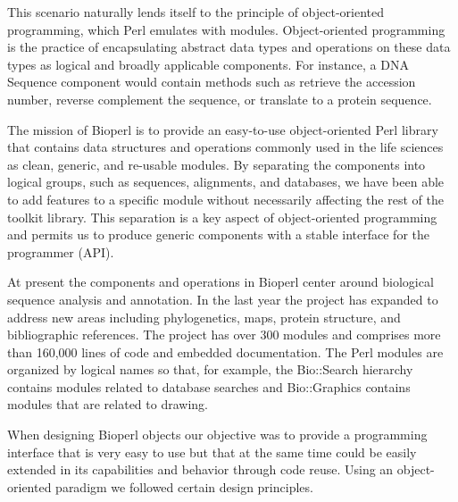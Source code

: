 \documentclass[12pt]{article}
\begin{document}
This scenario naturally lends itself to the principle of
object-oriented programming, which Perl emulates with modules.
Object-oriented programming is the practice of encapsulating abstract
data types and operations on these data types as logical and broadly
applicable components. For instance, a DNA Sequence component would
contain methods such as retrieve the accession number, reverse
complement the sequence, or translate to a protein sequence.

The mission of Bioperl is to provide an easy-to-use object-oriented
Perl library that contains data structures and operations commonly
used in the life sciences as clean, generic, and re-usable modules.
By separating the components into logical groups, such as sequences,
alignments, and databases, we have been able to add features to a
specific module without necessarily affecting the rest of the toolkit
library.  This separation is a key aspect of object-oriented
programming and permits us to produce generic components with a stable
interface for the programmer (API).

At present the components and operations in Bioperl center around
biological sequence analysis and annotation.  In the last year the
project has expanded to address new areas including phylogenetics,
maps, protein structure, and bibliographic references.  The project
has over 300 modules and comprises more than 160,000 lines of code and
embedded documentation.  The Perl modules are organized by logical
names so that, for example, the Bio::Search hierarchy contains modules
related to database searches and Bio::Graphics contains modules that
are related to drawing.

When designing Bioperl objects our objective was to provide a
programming interface that is very easy to use but that at the same
time could be easily extended in its capabilities and behavior through
code reuse.  Using an object-oriented paradigm we followed certain
design principles.
\end{document}
